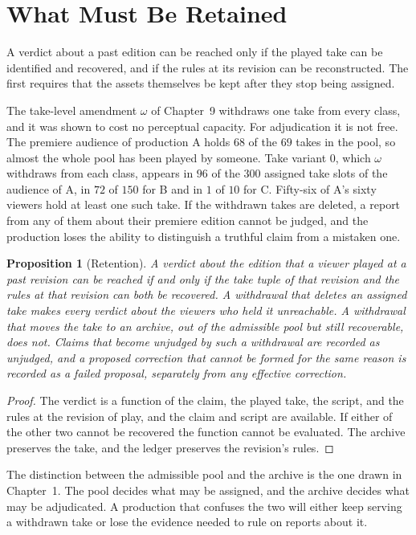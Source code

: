 \documentclass[11pt,twoside,openright]{book}
\theoremstyle{plain}
\newtheorem{proposition}[theorem]{Proposition}
\theoremstyle{definition}
\theoremstyle{remark}
\begin{document}
\section{What Must Be Retained}\label{sec:retention}

A verdict about a past edition can be reached only if the played take can be identified and recovered, and if the rules at its revision can be reconstructed. The first requires that the assets themselves be kept after they stop being assigned.

The take-level amendment $\omega$ of Chapter~9 withdraws one take from every class, and it was shown to cost no perceptual capacity. For adjudication it is not free. The premiere audience of production A holds $68$ of the $69$ takes in the pool, so almost the whole pool has been played by someone. Take variant $0$, which $\omega$ withdraws from each class, appears in $96$ of the $300$ assigned take slots of the audience of A, in $72$ of $150$ for B and in $1$ of $10$ for C. Fifty-six of A's sixty viewers hold at least one such take. If the withdrawn takes are deleted, a report from any of them about their premiere edition cannot be judged, and the production loses the ability to distinguish a truthful claim from a mistaken one.

\begin{proposition}[Retention]\label{prop:retention}
A verdict about the edition that a viewer played at a past revision can be reached if and only if the take tuple of that revision and the rules at that revision can both be recovered. A withdrawal that deletes an assigned take makes every verdict about the viewers who held it unreachable. A withdrawal that moves the take to an archive, out of the admissible pool but still recoverable, does not. Claims that become unjudged by such a withdrawal are recorded as unjudged, and a proposed correction that cannot be formed for the same reason is recorded as a failed proposal, separately from any effective correction.
\end{proposition}

\begin{proof}
The verdict is a function of the claim, the played take, the script, and the rules at the revision of play, and the claim and script are available. If either of the other two cannot be recovered the function cannot be evaluated. The archive preserves the take, and the ledger preserves the revision's rules.
\end{proof}

The distinction between the admissible pool and the archive is the one drawn in Chapter~1. The pool decides what may be assigned, and the archive decides what may be adjudicated. A production that confuses the two will either keep serving a withdrawn take or lose the evidence needed to rule on reports about it.
\end{document}
